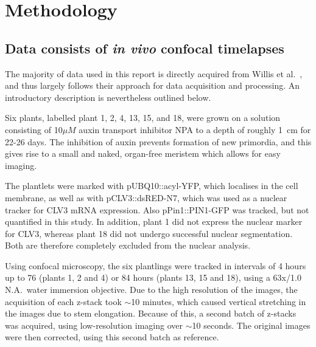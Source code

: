 
\chapter{Methodology}

\ifpdf
\graphicspath{{Chapter2/Figs/Raster/}{Chapter2/Figs/PDF/}{Chapter2/Figs/}}
\else
\graphicspath{{Chapter2/Figs/Vector/}{Chapter2/Figs/}}
\fi

\section[Raw data]{Data consists of \textit{in vivo} confocal timelapses}
The majority of data used in this report is directly acquired from Willis et
al.~\cite{willis2016cell}, and thus largely follows their approach for data
acquisition and processing. An introductory description is nevertheless outlined
below. 

Six plants, labelled plant 1, 2, 4, 13, 15, and 18, were grown on a
solution consisting of 10$\mu M$ auxin transport inhibitor NPA to a depth of
roughly 1~cm for 22-26 days. The inhibition of auxin prevents formation of new
primordia, and this gives rise to a small and naked, organ-free meristem which
allows for easy imaging. 

The plantlets were marked with pUBQ10::acyl-YFP, which localises in the cell
membrane, as well as with pCLV3::dsRED-N7, which was used
as a nuclear tracker for CLV3 mRNA expression. Also pPin1::PIN1-GFP was tracked,
but not quantified in this study. In addition, plant 1 did not express the nuclear marker
for CLV3, whereas plant 18 did not undergo successful nuclear segmentation. Both
are therefore completely excluded from the nuclear analysis.

Using confocal microscopy, the six plantlings were tracked in
intervals of 4 hours up to 76 (plants 1, 2 and 4) or 84 hours
(plants 13, 15 and 18), using a 63x/1.0 N.A.\ water immersion objective.
Due to the high resolution of the images, the acquisition of each z-stack took
$\sim$10 minutes, which caused vertical stretching in the images due to stem
elongation. Because of this, a second batch of z-stacks was acquired, using
low-resolution imaging over $\sim$10 seconds. The original images were then
corrected, using this second batch as reference.

